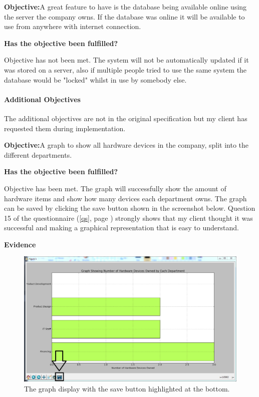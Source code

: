 \textbf{Objective:}A great feature to have is the database being available online using the server the company owns. If the database was online it will be available to use from anywhere with internet connection.

\textbf{Has the objective been fulfilled?}

Objective has not been met. The system will not be automatically updated if it was stored on a server, also if multiple people tried to use the same system the database would be "locked" whilst in use by somebody else. 


\paragraph{Additional Objectives}

The additional objectives are not in the original specification but my client has requested them during implementation.

\textbf{Objective:}A graph to show all hardware devices in the company, split into the different departments.

\textbf{Has the objective been fulfilled?}

Objective has been met. The graph will successfully show the amount of hardware items and show how many devices each department owns. The graph can be saved by clicking the save button shown in the screenshot below. Question 15 of the questionnaire (\ref{qs}, page \pageref{qs}) strongly shows that my client thought it was successful and making a graphical representation that is easy to understand.

\textbf{Evidence}

\begin{figure}[H]
    \includegraphics[width=\textwidth]{./Manual/Images/graph2.png}
    \caption{The graph display with the save button highlighted at the bottom.} 
\end{figure}

